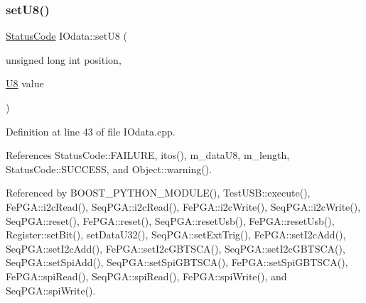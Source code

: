 \subsubsection{\texorpdfstring{set\+U8()}{setU8()}}
{\footnotesize\ttfamily \hyperlink{classStatusCode}{Status\+Code} I\+Odata\+::set\+U8 (\begin{DoxyParamCaption}\item[{unsigned long int}]{position,  }\item[{\hyperlink{classIOdata_a18d1354b7cdaf0f8a8001fdbb3ced418}{U8}}]{value }\end{DoxyParamCaption})}



Definition at line 43 of file I\+Odata.\+cpp.



References Status\+Code\+::\+F\+A\+I\+L\+U\+RE, itos(), m\+\_\+data\+U8, m\+\_\+length, Status\+Code\+::\+S\+U\+C\+C\+E\+SS, and Object\+::warning().



Referenced by B\+O\+O\+S\+T\+\_\+\+P\+Y\+T\+H\+O\+N\+\_\+\+M\+O\+D\+U\+L\+E(), Test\+U\+S\+B\+::execute(), Fe\+P\+G\+A\+::i2c\+Read(), Seq\+P\+G\+A\+::i2c\+Read(), Fe\+P\+G\+A\+::i2c\+Write(), Seq\+P\+G\+A\+::i2c\+Write(), Seq\+P\+G\+A\+::reset(), Fe\+P\+G\+A\+::reset(), Seq\+P\+G\+A\+::reset\+Usb(), Fe\+P\+G\+A\+::reset\+Usb(), Register\+::set\+Bit(), set\+Data\+U32(), Seq\+P\+G\+A\+::set\+Ext\+Trig(), Fe\+P\+G\+A\+::set\+I2c\+Add(), Seq\+P\+G\+A\+::set\+I2c\+Add(), Fe\+P\+G\+A\+::set\+I2c\+G\+B\+T\+S\+C\+A(), Seq\+P\+G\+A\+::set\+I2c\+G\+B\+T\+S\+C\+A(), Seq\+P\+G\+A\+::set\+Spi\+Add(), Seq\+P\+G\+A\+::set\+Spi\+G\+B\+T\+S\+C\+A(), Fe\+P\+G\+A\+::set\+Spi\+G\+B\+T\+S\+C\+A(), Fe\+P\+G\+A\+::spi\+Read(), Seq\+P\+G\+A\+::spi\+Read(), Fe\+P\+G\+A\+::spi\+Write(), and Seq\+P\+G\+A\+::spi\+Write().



